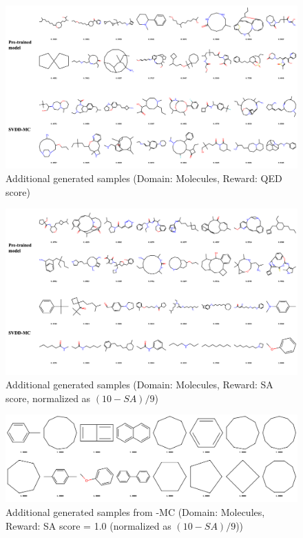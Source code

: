 \begin{figure}[!th]
    \centering
    \includegraphics[width=1.0\linewidth]{images/qed.png}
    \caption{Additional generated samples (Domain: Molecules, Reward: QED score)}
    \label{fig:qed}
\end{figure}

\begin{figure}[!th]
    \centering
    \includegraphics[width=1.0\linewidth]{images/sa.png}
    \caption{Additional generated samples (Domain: Molecules, Reward: SA score, normalized as $(10-SA)/9$)}
    \label{fig:sa}
\end{figure}

\begin{figure}[!th]
    \centering
    \includegraphics[width=1.0\linewidth]{images/molecule_SA1.0_grid_zinc_ours.png}
    \caption{Additional generated samples from {\alg}-MC (Domain: Molecules, Reward: SA score = 1.0 (normalized as $(10-SA)/9$))}
    \label{fig:sa1.0}
\end{figure}

